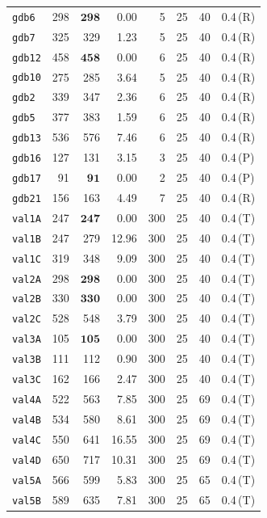 \begin{longtable}{lrrrrrrl}
\texttt{gdb6} & 298 & $\mathbf{298}$ & 0.00 & 5 & 25 & 40 & 0.4\,(R) \\
\texttt{gdb7} & 325 & 329 & 1.23 & 5 & 25 & 40 & 0.4\,(R) \\
\texttt{gdb12} & 458 & $\mathbf{458}$ & 0.00 & 6 & 25 & 40 & 0.4\,(R) \\
\texttt{gdb10} & 275 & 285 & 3.64 & 5 & 25 & 40 & 0.4\,(R) \\
\texttt{gdb2} & 339 & 347 & 2.36 & 6 & 25 & 40 & 0.4\,(R) \\
\texttt{gdb5} & 377 & 383 & 1.59 & 6 & 25 & 40 & 0.4\,(R) \\
\texttt{gdb13} & 536 & 576 & 7.46 & 6 & 25 & 40 & 0.4\,(R) \\
\texttt{gdb16} & 127 & 131 & 3.15 & 3 & 25 & 40 & 0.4\,(P) \\
\texttt{gdb17} & 91 & $\mathbf{91}$ & 0.00 & 2 & 25 & 40 & 0.4\,(P) \\
\texttt{gdb21} & 156 & 163 & 4.49 & 7 & 25 & 40 & 0.4\,(R) \\
\texttt{val1A} & 247 & $\mathbf{247}$ & 0.00 & 300 & 25 & 40 & 0.4\,(T) \\
\texttt{val1B} & 247 & 279 & 12.96 & 300 & 25 & 40 & 0.4\,(T) \\
\texttt{val1C} & 319 & 348 & 9.09 & 300 & 25 & 40 & 0.4\,(T) \\
\texttt{val2A} & 298 & $\mathbf{298}$ & 0.00 & 300 & 25 & 40 & 0.4\,(T) \\
\texttt{val2B} & 330 & $\mathbf{330}$ & 0.00 & 300 & 25 & 40 & 0.4\,(T) \\
\texttt{val2C} & 528 & 548 & 3.79 & 300 & 25 & 40 & 0.4\,(T) \\
\texttt{val3A} & 105 & $\mathbf{105}$ & 0.00 & 300 & 25 & 40 & 0.4\,(T) \\
\texttt{val3B} & 111 & 112 & 0.90 & 300 & 25 & 40 & 0.4\,(T) \\
\texttt{val3C} & 162 & 166 & 2.47 & 300 & 25 & 40 & 0.4\,(T) \\
\texttt{val4A} & 522 & 563 & 7.85 & 300 & 25 & 69 & 0.4\,(T) \\
\texttt{val4B} & 534 & 580 & 8.61 & 300 & 25 & 69 & 0.4\,(T) \\
\texttt{val4C} & 550 & 641 & 16.55 & 300 & 25 & 69 & 0.4\,(T) \\
\texttt{val4D} & 650 & 717 & 10.31 & 300 & 25 & 69 & 0.4\,(T) \\
\texttt{val5A} & 566 & 599 & 5.83 & 300 & 25 & 65 & 0.4\,(T) \\
\texttt{val5B} & 589 & 635 & 7.81 & 300 & 25 & 65 & 0.4\,(T) \\

\end{longtable}
